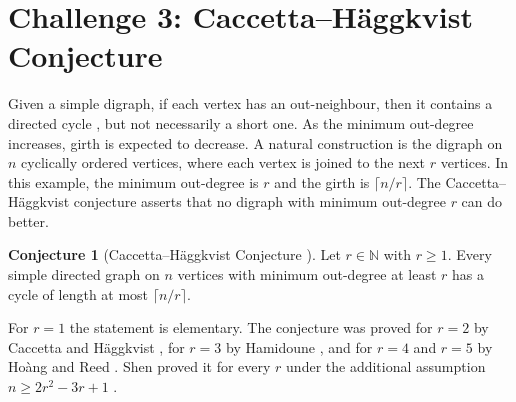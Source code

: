 \documentclass[12pt]{article}
\numberwithin{equation}{section}
\theoremstyle{definition}
\newtheorem{definition}{Definition}
\newtheorem{conjecture}[theorem]{Conjecture}
\newcommand{\ev}[1]{( #1 )}
\begin{document}
\section*{Challenge 3: Caccetta--H\"aggkvist Conjecture}

%

Given a simple digraph, if each vertex has an out-neighbour, then it contains a directed cycle \cite{bangjensen2009digraphs}, but not necessarily a short one. As the minimum out-degree increases, girth is expected to decrease. A natural construction is the digraph on $n$ cyclically ordered vertices, where each vertex is joined to the next $r$ vertices. In this example, the minimum out-degree is $r$ and the girth is $\lceil n/r\rceil$. The Caccetta--H\"aggkvist conjecture asserts that no digraph with minimum out-degree $r$ can do better. 
\begin{conjecture}[Caccetta--H\"aggkvist Conjecture \mbox{\cite{caccetta1978minimal}}]\label{conj:ch}
Let $r\in \mathbb{N}$ with $r\geq 1$. Every simple directed graph on $n$ vertices with minimum out-degree at least $r$ has a cycle of length at most $\lceil n/r\rceil$.
\end{conjecture}
For $r=1$ the statement is elementary. The conjecture was proved for $r=2$ by Caccetta and H\"aggkvist \cite{caccetta1978minimal}, for $r=3$ by Hamidoune \cite{hamidoune1987note}, and for $r=4$ and $r=5$ by Ho\`ang and Reed \cite{hoang1987note}. Shen proved it for every $r$ under the additional assumption $n\geq 2r^2-3r+1$ \cite{shen2000girth}. 

\printbibliography
\end{document}
